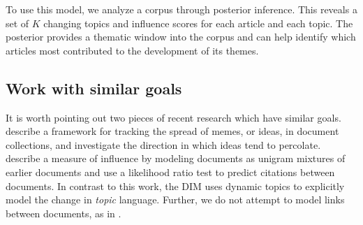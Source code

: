 
To use this model, we analyze a corpus through posterior inference.
This reveals a set of $K$ changing topics and influence scores for
each article and each topic.  The posterior provides a thematic window
into the corpus and can help identify which articles most contributed
to the development of its themes.

\subsection*{Work with similar goals}

It is worth pointing out two pieces of recent research which have similar
goals. \cite{leskovec:2009} describe a framework for tracking the
spread of memes, or ideas, in document collections, and investigate
the direction in which ideas tend to percolate.
\cite{shaparenko:2007} describe a measure of influence by modeling
documents as unigram mixtures of earlier documents and use a
likelihood ratio test to predict citations between documents. In
contrast to this work, the DIM uses dynamic topics to explicitly model
the change in \emph{topic} language.  Further, we do not attempt to
model links between documents, as in \cite{shaparenko:2007}.  %
